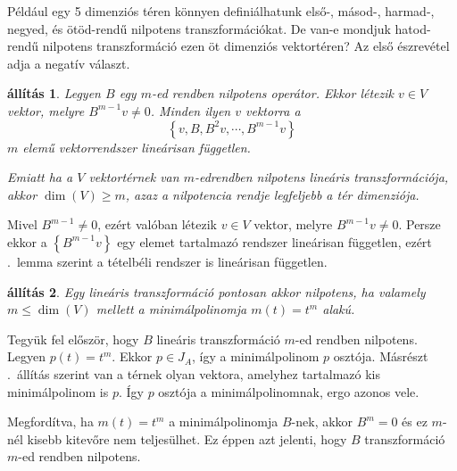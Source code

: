 \documentclass[9pt, a4paper, showtrims]{memoir}
\makeatletter
\renewenvironment{proof}[1][\proofname]
    {\par\pushQED{\qed}%
    \normalfont \topsep6\p@\@plus6\p@\relax
    \trivlist
    \item[\hskip\labelsep
        \itshape
    #1\@addpunct{:}]\ignorespaces}
    {\popQED\endtrivlist\@endpefalse}
\theoremstyle{plain}
\newtheorem{proposition}{állítás}[chapter]
\theoremstyle{remark}
\theoremstyle{definition}
\makeatother
\begin{document}
Például egy 5 dimenziós téren könnyen definiálhatunk első-, másod-, harmad-, negyed, és ötöd-rendű nilpotens transzformációkat.
De van-e mondjuk hatod-rendű nilpotens transzformáció ezen öt dimenziós vektortéren?
Az első észrevétel adja a negatív választ.
\begin{proposition}
	Legyen $B$ egy $m$-ed rendben nilpotens operátor.
	Ekkor létezik $v\in V$ vektor,
	melyre $B^{m-1}v\neq 0$.
	Minden ilyen $v$ vektorra a
	\[
		\left\{ v,B,B^2v,\cdots,B^{m-1}v \right\}
	\]
	$m$ elemű vektorrendszer lineárisan független.

	Emiatt ha a $V$ vektortérnek van $m$-edrendben nilpotens lineáris transzformációja, akkor $\dim(V)\geq m$,
	azaz a nilpotencia rendje legfeljebb a tér dimenziója.
	\label{th:fgtlen}
\end{proposition}
\begin{proof}
	Mivel $B^{m-1}\neq 0$, ezért valóban létezik $v\in V$ vektor,
	melyre $B^{m-1}v\neq 0$.
	Persze ekkor a $\left\{ B^{m-1}v \right\}$ egy elemet tartalmazó rendszer lineárisan független,
	ezért .~lemma szerint a tételbéli rendszer is lineárisan független.
\end{proof}
\begin{proposition}
	Egy lineáris transzformáció pontosan akkor nilpotens,
	ha valamely $m\leq\dim(V)$ mellett a minimálpolinomja
	$m\left( t \right)=t^m$ alakú.
\end{proposition}
\begin{proof}
	Tegyük fel először, hogy $B$ lineáris transzformáció $m$-ed rendben
	nilpotens.
	Legyen $p\left( t \right)=t^m$.
	Ekkor $p\in J_A$, így a minimálpolinom $p$ osztója.
	Másrészt .~állítás szerint van a térnek olyan vektora,
	amelyhez tartalmazó kis minimálpolinom is $p$.
	Így $p$ osztója a minimálpolinomnak, ergo azonos vele.

	Megfordítva, ha $m\left( t \right)=t^m$ a minimálpolinomja $B$-nek,
	akkor $B^m=0$ és ez $m$-nél kisebb kitevőre nem teljesülhet.
	Ez éppen azt jelenti, hogy $B$ transzformáció $m$-ed rendben nilpotens.
\end{proof}
\end{document}
